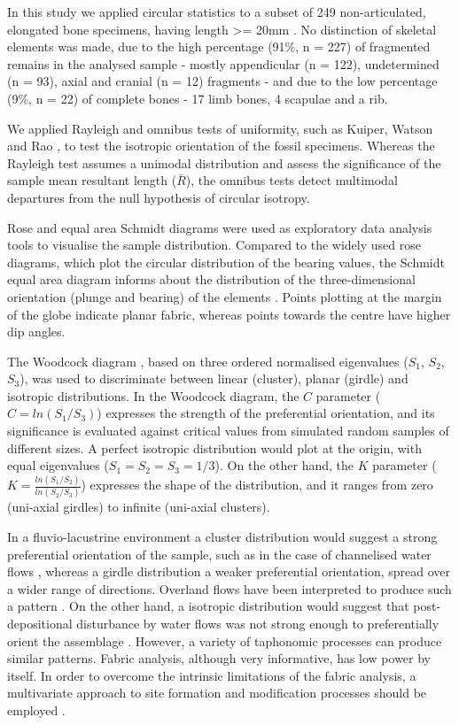\documentclass[5p,times,authoryear]{elsarticle}
\begin{document}
In this study we applied circular statistics to a subset of 249 non-articulated, elongated bone specimens, having length >= 20mm \citep{Dominguez-Rodrigo2014}. No distinction of skeletal elements was made, due to the high percentage (91\%, n = 227) of fragmented remains in the analysed sample - mostly appendicular (n = 122), undetermined (n = 93), axial and cranial (n = 12) fragments - and due to the low percentage (9\%, n = 22) of complete bones - 17 limb bones, 4 scapulae and a rib.

We applied Rayleigh and omnibus tests of uniformity, such as Kuiper, Watson and Rao \citep{Jammalamadaka2001}, to test the isotropic orientation of the fossil specimens. Whereas the Rayleigh test assumes a unimodal distribution and assess the significance of the sample mean resultant length ($\bar{R}$), the omnibus tests detect multimodal departures from the null hypothesis of circular isotropy.

Rose and equal area Schmidt diagrams were used as exploratory data analysis tools to visualise the sample distribution. Compared to the widely used rose diagrams, which plot the circular distribution of the bearing values, the Schmidt equal area diagram informs about the distribution of the three-dimensional orientation (plunge and bearing) of the elements \citep{Fiorillo1988}. Points plotting at the margin of the globe indicate planar fabric, whereas points towards the centre have higher dip angles.

The Woodcock diagram \citep{Woodcock1983}, based on three ordered normalised eigenvalues ($S_1$, $S_2$, $S_3$), was used to discriminate between linear (cluster), planar (girdle) and isotropic distributions. In the Woodcock diagram, the $C$ parameter ($C=ln(S_1/S_3)$) expresses the strength of the preferential orientation, and its significance is evaluated against critical values from simulated random samples of different sizes. A perfect isotropic distribution would plot at the origin, with equal eigenvalues ($S_1=S_2=S_3=1/3$). On the other hand, the $K$ parameter ($K=\frac{ln(S_1/S_2)}{ln(S_2/S_3)}$) expresses the shape of the distribution, and it ranges from zero (uni-axial girdles) to infinite (uni-axial clusters).

In a fluvio-lacustrine environment a cluster distribution would suggest a strong preferential orientation of the sample, such as in the case of channelised water flows \citep{Petraglia1994}, whereas a girdle distribution a weaker preferential orientation, spread over a wider range of directions. Overland flows have been interpreted to produce such a pattern \citep{Organista2017}. On the other hand, a isotropic distribution would suggest that post-depositional disturbance by water flows was not strong enough to preferentially orient the assemblage \citep{Dominguez-Rodrigo2014c}. However, a variety of taphonomic processes can produce similar patterns. Fabric analysis, although very informative, has low power by itself. In order to overcome the intrinsic limitations of the fabric analysis, a multivariate approach to site formation and modification processes should be employed \citep{Lenoble2004}.
\end{document}
